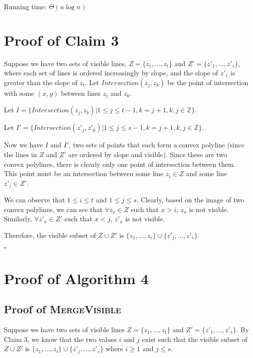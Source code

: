 \documentclass[12pt,letterpaper]{article}
\begin{document}
Running time: $\Theta(n\log{n})$

\section{Proof of Claim 3}

Suppose we have two sets of visible lines, $Z = \{ z_1, ..., z_t \}$ and $Z' = \{ z'_1, ..., z'_s \}$, where each set of lines is ordered increasingly by slope, and the slope of $z'_1$ is greater than the slope of $z_t$. Let $Intersection(z_j, z_k)$ be the point of intersection with some $(x, y)$ between lines $z_j$ and $z_k$. 

Let $I  = \{ Intersection(z_j, z_k) | 1 \leq j \leq t - 1, k = j + 1, k, j \in \mathbb{Z} \}$.

Let $I' = \{ Intersection(z'_j, z'_k) | 1 \leq j \leq s - 1, k = j + 1, k, j \in \mathbb{Z}  \}$.

Now we have $I$ and $I'$, two sets of points that each form a convex polyline (since the lines in $Z$ and $Z'$ are ordered by slope and visible). Since these are two convex polylines, there is clearly only one point of intersection between them. This point must be an intersection between some line $z_i \in Z$ and some line $z'_j \in Z'$.

We can observe that $1 \leq i \leq t$ and $1 \leq j \leq s$. Clearly, based on the image of two convex polylines, we can see that $\forall z_x \in Z$ such that $x > i$, $z_x$ is not visible. Similarly, $\forall z'_x \in Z'$ such that $x < j$, $z'_x$ is not visible.

Therefore, the visible subset of $Z \cup Z'$ is $\{z_1, ..., z_i \} \cup \{ z'_j, ..., z'_s \}$.

$\square$

\section{Proof of Algorithm 4}

\subsection{Proof of \textsc{MergeVisible}}

Suppose we have two sets of visible lines $Z = \{ z_1, ..., z_t \}$ and $ Z' = \{ z'_1, ..., z'_s \}$.
By Claim 3, we know that the two values $i$ and $j$ exist such that the visible subset of $Z \cup Z'$ is 
$\{z_1, ..., z_i \} \cup \{ z'_j, ..., z'_s \}$ where $i \geq 1$ and $j \leq s$.
\end{document}
